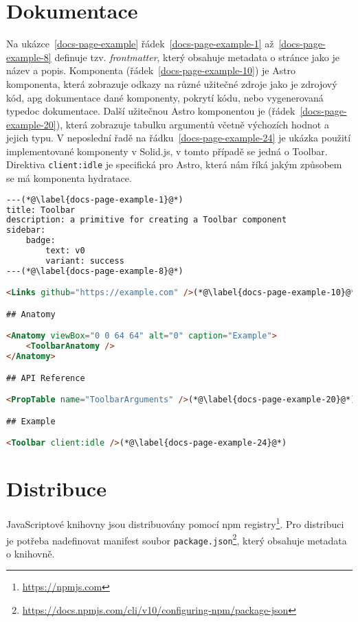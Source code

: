 \clearpage

\section{Dokumentace}

Na ukázce~\ref{docs-page-example} řádek~\ref{docs-page-example-1} až~\ref{docs-page-example-8} definuje tzv. \textit{frontmatter}, který obsahuje metadata o stránce jako je název a popis.
Komponenta  (řádek~\ref{docs-page-example-10}) je Astro komponenta, která zobrazuje odkazy na různé užitečné zdroje jako je zdrojový kód, \gls{apg} dokumentace dané komponenty, pokrytí kódu, nebo vygenerovaná typedoc dokumentace.
Další užitečnou Astro komponentou je  (řádek~\ref{docs-page-example-20}), která zobrazuje tabulku argumentů včetně výchozích hodnot a jejich typu.
V neposlední řadě na řádku~\ref{docs-page-example-24} je ukázka použití implementované komponenty v Solid.js, v tomto případě se jedná o Toolbar.
Direktiva \texttt{client:idle} je specifická pro Astro, která nám říká jakým způsobem se má komponenta \gls{hydratace}.

\begin{lstlisting}[caption={Ukázka stránky dokumentace psané v MDX}, label={docs-page-example}, language=html]
---(*@\label{docs-page-example-1}@*)
title: Toolbar
description: a primitive for creating a Toolbar component
sidebar:
    badge:
        text: v0
        variant: success
---(*@\label{docs-page-example-8}@*)

<Links github="https://example.com" />(*@\label{docs-page-example-10}@*)

## Anatomy

<Anatomy viewBox="0 0 64 64" alt="0" caption="Example">
    <ToolbarAnatomy />
</Anatomy>

## API Reference

<PropTable name="ToolbarArguments" />(*@\label{docs-page-example-20}@*)

## Example

<Toolbar client:idle />(*@\label{docs-page-example-24}@*)
\end{lstlisting}

\section{Distribuce}

JavaScriptové knihovny jsou distribuovány pomocí npm registry\footnote{\url{https://npmjs.com}}.
Pro distribuci je potřeba nadefinovat manifest soubor \texttt{package.json}\footnote{\url{https://docs.npmjs.com/cli/v10/configuring-npm/package-json}}, který obsahuje metadata o knihovně.

